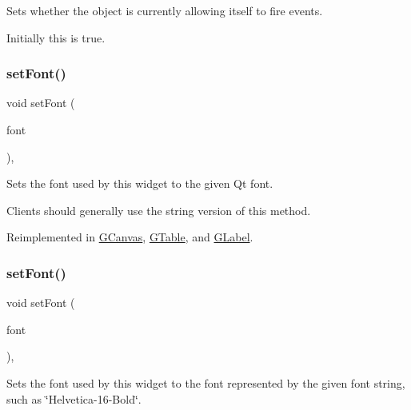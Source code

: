 Sets whether the object is currently allowing itself to fire events. 

Initially this is true. \mbox{\label{classGInteractor_a2592348886ffea646c6534bf88f7c49d}} 
\subsubsection{\texorpdfstring{set\+Font()}{setFont()}\hspace{0.1cm}{\footnotesize\ttfamily [1/2]}}
{\footnotesize\ttfamily void set\+Font (\begin{DoxyParamCaption}\item[{const Q\+Font \&}]{font }\end{DoxyParamCaption})\hspace{0.3cm}{\ttfamily [virtual]}, {\ttfamily [inherited]}}



Sets the font used by this widget to the given Qt font. 

Clients should generally use the string version of this method. 

Reimplemented in \mbox{\hyperlink{classGCanvas_a2d22014c7fa3bccfd58c982aea1b55fa}{G\+Canvas}}, \mbox{\hyperlink{classGTable_a2d22014c7fa3bccfd58c982aea1b55fa}{G\+Table}}, and \mbox{\hyperlink{classGLabel_a2d22014c7fa3bccfd58c982aea1b55fa}{G\+Label}}.

\mbox{\label{classGInteractor_a8e096e8818d838aceae1d46d58fb3a7b}} 
\subsubsection{\texorpdfstring{set\+Font()}{setFont()}\hspace{0.1cm}{\footnotesize\ttfamily [2/2]}}
{\footnotesize\ttfamily void set\+Font (\begin{DoxyParamCaption}\item[{const std\+::string \&}]{font }\end{DoxyParamCaption})\hspace{0.3cm}{\ttfamily [virtual]}, {\ttfamily [inherited]}}



Sets the font used by this widget to the font represented by the given font string, such as \char`\"{}\+Helvetica-\/16-\/\+Bold\char`\"{}. 



